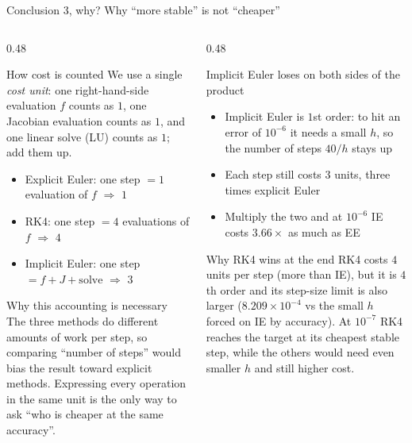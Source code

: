 \documentclass[aspectratio=169,10pt]{beamer}
\begin{document}
\begin{frame}{Conclusion 3, why?  Why ``more stable'' is not ``cheaper''}
  \begin{columns}[T]
    \begin{column}{0.48\textwidth}
      \begin{block}{How cost is counted}
        \footnotesize
        We use a single \emph{cost unit}: one right-hand-side evaluation $f$
        counts as $1$, one Jacobian evaluation counts as $1$, and one linear
        solve (LU) counts as $1$; add them up.
        \begin{itemize}
          \setlength{\itemsep}{0.05em}
          \item Explicit Euler: one step $=1$ evaluation of $f$ $\Rightarrow$ $1$
          \item RK4: one step $=4$ evaluations of $f$ $\Rightarrow$ $4$
          \item Implicit Euler: one step $=f+J+\text{solve}$ $\Rightarrow$ $3$
        \end{itemize}
      \end{block}
      \begin{block}{Why this accounting is necessary}
        \footnotesize
        The three methods do different amounts of work per step, so comparing
        ``number of steps'' would bias the result toward explicit methods.
        Expressing every operation in the same unit is the only way to ask
        ``who is cheaper at the same accuracy''.
      \end{block}
    \end{column}
    \begin{column}{0.48\textwidth}
      \begin{alertblock}{Implicit Euler loses on both sides of the product}
        \footnotesize
        \begin{itemize}
          \setlength{\itemsep}{0.05em}
          \item Implicit Euler is $1$st order: to hit an error of $10^{-6}$
                it needs a small $h$, so the number of steps $40/h$ stays up
          \item Each step still costs $3$ units, three times explicit Euler
          \item Multiply the two and at $10^{-6}$ IE costs
                \alert{$3.66\times$} as much as EE
        \end{itemize}
      \end{alertblock}
      \begin{block}{Why RK4 wins at the end}
        \footnotesize
        RK4 costs $4$ units per step (more than IE), but it is $4$th order
        and its step-size limit is also larger ($8.209\times10^{-4}$ vs the
        small $h$ forced on IE by accuracy).  At $10^{-7}$ RK4 reaches the
        target at its cheapest stable step, while the others would need even
        smaller $h$ and still higher cost.
      \end{block}
    \end{column}
  \end{columns}
\end{frame}
\end{document}
